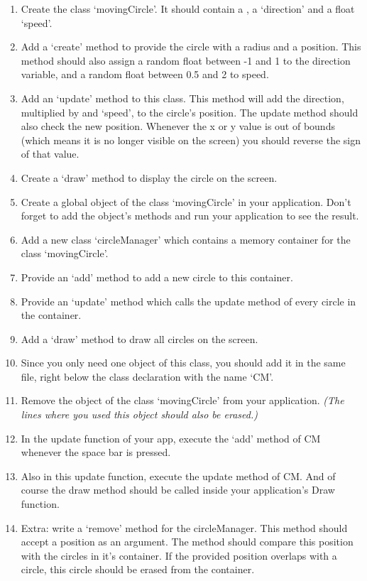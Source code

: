 \begin{exercise}
\begin{enumerate}
\item Create the class `movingCircle'. It should contain a , a  `direction' and a float `speed'. 
\item Add a `create' method to provide the circle with a radius and a position. This method should also assign a random float between -1 and 1 to the direction variable, and a random float between 0.5 and 2 to speed. 
\item Add an `update' method to this class. This method will add the direction, multiplied by  and `speed', to the circle's position. The update method should also check the new position. Whenever the x or y value is out of bounds (which means it is no longer visible on the screen) you should reverse the sign of that value.
\item Create a `draw' method to display the circle on the screen.
\item Create a global object of the class `movingCircle' in your application. Don't forget to add the object's methods and run your application to see the result.

\item Add a new class `circleManager' which contains a memory container for the class `movingCircle'.
\item Provide an `add' method to add a new circle to this container.
\item Provide an `update' method which calls the update method of every circle in the container.
\item Add a `draw' method to draw all circles on the screen.
\item Since you only need one object of this class, you should add it in the same file, right below the class declaration with the name `CM'.

\item Remove the object of the class `movingCircle' from your application. \textsl{(The lines where you used this object should also be erased.)}
\item In the update function of your app, execute the `add' method of CM whenever the space bar is pressed.
\item Also in this update function, execute the update method of CM. And of course the draw method should be called inside your application's Draw function.

\item Extra: write a `remove' method for the circleManager. This method should accept a position as an argument. The method should compare this position with the circles in it's container. If the provided position overlaps with a circle, this circle should be erased from the container.
\end{enumerate}
\end{exercise}

